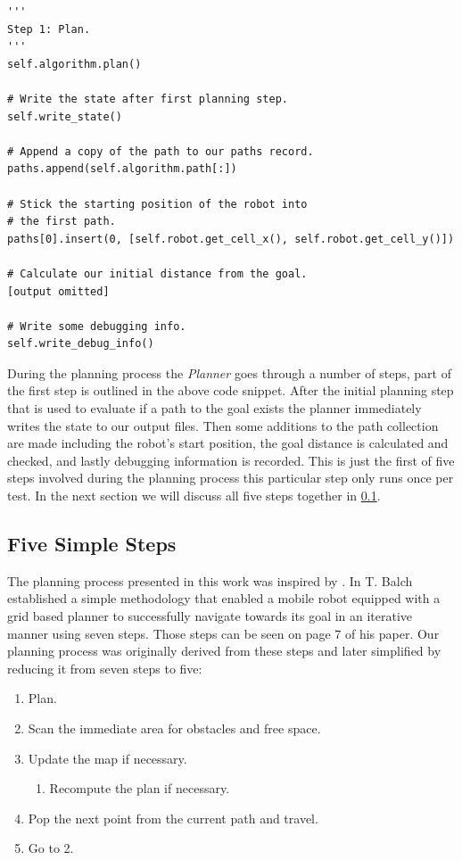 \begin{lstlisting}
'''
Step 1: Plan.
'''
self.algorithm.plan()

# Write the state after first planning step.
self.write_state()

# Append a copy of the path to our paths record.
paths.append(self.algorithm.path[:])

# Stick the starting position of the robot into
# the first path.
paths[0].insert(0, [self.robot.get_cell_x(), self.robot.get_cell_y()])

# Calculate our initial distance from the goal.
[output omitted]

# Write some debugging info.
self.write_debug_info()
\end{lstlisting}

\noindent
During the planning process the \textit{Planner} goes through a number of steps, part of the first step is outlined in the above code snippet. After the initial planning step that is used to evaluate if a path to the goal exists the planner immediately writes the state to our output files. Then some additions to the path collection are made including the robot's start position, the goal distance is calculated and checked, and lastly debugging information is recorded. This is just the first of five steps involved during the planning process this particular step only runs once per test. In the next section we will discuss all five steps together in \ref{steps}.

\subsection{Five Simple Steps}\label{steps}
\noindent
The planning process presented in this work was inspired by \cite{GRIDNAV95}. In \cite{GRIDNAV95} T. Balch established a simple methodology that enabled a mobile robot equipped with a grid based planner to successfully navigate towards its goal in an iterative manner using seven steps. Those steps can be seen on page 7 of his paper. Our planning process was originally derived from these steps and later simplified by reducing it from seven steps to five:

\newpage

\begin{enumerate}
\item Plan.
\item Scan the immediate area for obstacles and free space.
\item Update the map if necessary.
\begin{enumerate}
\item Recompute the plan if necessary.
\end{enumerate}
\item Pop the next point from the current path and travel.
\item Go to 2.
\end{enumerate}

